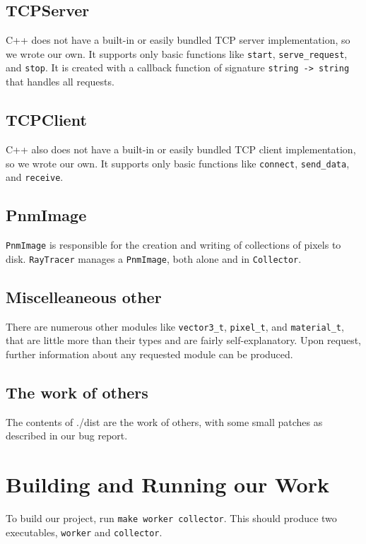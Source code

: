 \documentclass[letterpaper,twocolumn,10pt]{article}
\begin{document}
\subsection{TCPServer}

C++ does not have a built-in or easily bundled TCP server implementation, so we
wrote our own. It supports only basic functions like \verb|start|,
\verb|serve_request|, and \verb|stop|. It is created with a callback function of
signature \verb|string -> string| that handles all requests.

\subsection{TCPClient}

C++ also does not have a built-in or easily bundled TCP client implementation,
so we wrote our own. It supports only basic functions like \verb|connect|,
\verb|send_data|, and \verb|receive|.

\subsection{PnmImage}

\verb|PnmImage| is responsible for the creation and writing of collections of
pixels to disk. \verb|RayTracer| manages a \verb|PnmImage|, both alone and in
\verb|Collector|.

\subsection{Miscelleaneous other}

There are numerous other modules like \verb|vector3_t|, \verb|pixel_t|, and
\verb|material_t|, that are little more than their types and are fairly
self-explanatory. Upon request, further information about any requested module
can be produced.

\subsection{The work of others}
The contents of ./dist are the work of others, with some small patches as
described in our bug report.

\section{Building and Running our Work}

To build our project, run \verb|make worker collector|. This should
produce two executables, \verb|worker| and \verb|collector|.
\end{document}
